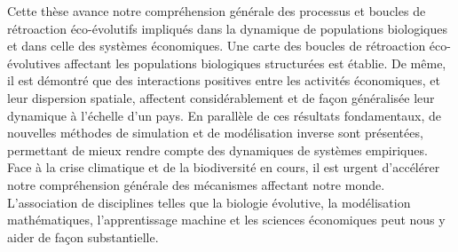 {Cette thèse avance notre compréhension générale des processus et boucles de rétroaction éco-évolutifs impliqués dans la dynamique de populations biologiques et dans celle des systèmes économiques. Une carte des boucles de rétroaction éco-évolutives affectant les populations biologiques structurées est établie. De même, il est démontré que des interactions positives entre les activités économiques, et leur dispersion spatiale, affectent considérablement et de façon généralisée leur dynamique à l'échelle d'un pays. En parallèle de ces résultats fondamentaux, de nouvelles méthodes de simulation et de modélisation inverse sont présentées, permettant de mieux rendre compte des dynamiques de systèmes empiriques. Face à la crise climatique et de la biodiversité en cours, il est urgent d'accélérer notre compréhension générale des mécanismes affectant notre monde. L'association de disciplines telles que la biologie évolutive, la modélisation mathématiques, l'apprentissage machine et les sciences économiques peut nous y aider de façon substantielle.}

